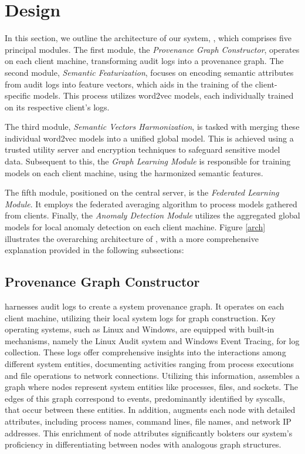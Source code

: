 \section{\Sys Design}
\label{sec:methodology}

In this section, we outline the architecture of our system, \Sys, which comprises five principal modules. The first module, the \textit{Provenance Graph Constructor}, operates on each client machine, transforming audit logs into a provenance graph. The second module, \textit{Semantic Featurization}, focuses on encoding semantic attributes from audit logs into feature vectors, which aids in the training of the client-specific \gnnshort models. This process utilizes word2vec models, each individually trained on its respective client's logs.

The third module, \textit{Semantic Vectors Harmonization}, is tasked with merging these individual word2vec models into a unified global model. This is achieved using a trusted utility server and encryption techniques to safeguard sensitive model data. Subsequent to this, the \textit{Graph Learning Module} is responsible for training \gnnshort models on each client machine, using the harmonized semantic features.

The fifth module, positioned on the central server, is the \textit{Federated Learning Module}. It employs the federated averaging algorithm to process \gnnshort models gathered from clients. Finally, the \textit{Anomaly Detection Module} utilizes the aggregated global models for local anomaly detection on each client machine. Figure \ref{arch} illustrates the overarching architecture of \Sys, with a more comprehensive explanation provided in the following subsections:

\subsection{Provenance Graph Constructor} 
\Sys harnesses audit logs to create a system provenance graph. It operates on each client machine, utilizing their local system logs for graph construction. Key operating systems, such as Linux and Windows, are equipped with built-in mechanisms, namely the Linux Audit system and Windows Event Tracing, for log collection. These logs offer comprehensive insights into the interactions among different system entities, documenting activities ranging from process executions and file operations to network connections. Utilizing this information, \Sys assembles a graph where nodes represent system entities like processes, files, and sockets. The edges of this graph correspond to events, predominantly identified by syscalls, that occur between these entities. In addition, \Sys augments each node with detailed attributes, including process names, command lines, file names, and network IP addresses. This enrichment of node attributes significantly bolsters our system's proficiency in differentiating between nodes with analogous graph structures.


